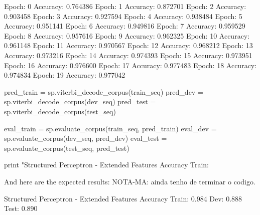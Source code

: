 \begin{exercise}
\begin{python}
Epoch: 0 Accuracy: 0.764386
Epoch: 1 Accuracy: 0.872701
Epoch: 2 Accuracy: 0.903458
Epoch: 3 Accuracy: 0.927594
Epoch: 4 Accuracy: 0.938484
Epoch: 5 Accuracy: 0.951141
Epoch: 6 Accuracy: 0.949816
Epoch: 7 Accuracy: 0.959529
Epoch: 8 Accuracy: 0.957616
Epoch: 9 Accuracy: 0.962325
Epoch: 10 Accuracy: 0.961148
Epoch: 11 Accuracy: 0.970567
Epoch: 12 Accuracy: 0.968212
Epoch: 13 Accuracy: 0.973216
Epoch: 14 Accuracy: 0.974393
Epoch: 15 Accuracy: 0.973951
Epoch: 16 Accuracy: 0.976600
Epoch: 17 Accuracy: 0.977483
Epoch: 18 Accuracy: 0.974834
Epoch: 19 Accuracy: 0.977042

pred_train = sp.viterbi_decode_corpus(train_seq)
pred_dev = sp.viterbi_decode_corpus(dev_seq)
pred_test = sp.viterbi_decode_corpus(test_seq)

eval_train = sp.evaluate_corpus(train_seq, pred_train)
eval_dev = sp.evaluate_corpus(dev_seq, pred_dev)
eval_test = sp.evaluate_corpus(test_seq, pred_test)

print "Structured Perceptron - Extended Features Accuracy Train: %
\end{python}

And here are the expected results:
NOTA-MA: ainda tenho de terminar o codigo.
\begin{python}
Structured Perceptron - Extended Features Accuracy Train: 0.984 Dev: 0.888 Test: 0.890
\end{python}

\end{exercise}





